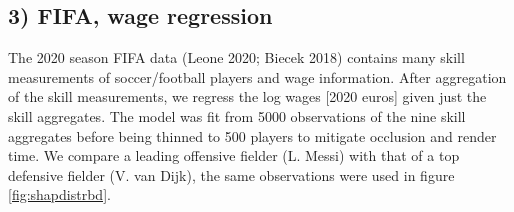 \documentclass[
  article]{article}
\begin{document}
\hypertarget{fifa-wage-regression}{%
\subsection{3) FIFA, wage regression}\label{fifa-wage-regression}}

The 2020 season FIFA data (Leone 2020; Biecek 2018) contains many skill measurements of soccer/football players and wage information. After aggregation of the skill measurements, we regress the log wages {[}2020 euros{]} given just the skill aggregates. The model was fit from 5000 observations of the nine skill aggregates before being thinned to 500 players to mitigate occlusion and render time. We compare a leading offensive fielder (L. Messi) with that of a top defensive fielder (V. van Dijk), the same observations were used in figure \ref{fig:shapdistrbd}.
\end{document}
